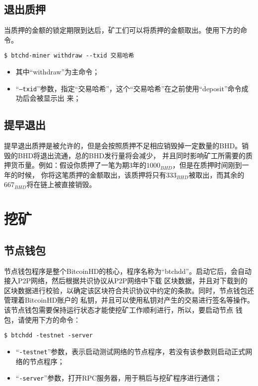 \subsection{退出质押}
\begin{flushleft}
    当质押的金额的锁定期限到达后，矿工们可以将质押的金额取出。使用下方的命令。
\end{flushleft}
\scriptsize
\begin{verbatim}
$ btchd-miner withdraw --txid 交易哈希
\end{verbatim}
\normalsize
\begin{itemize}
    \item 其中``withdraw''为主命令；
    \item ``\texttt{--txid}''参数，指定``交易哈希''，这个``交易哈希''在之前使用``deposit''命令成功后会被显示出
        来；
\end{itemize}
\subsection{提早退出}
\begin{flushleft}
    提早退出质押是被允许的，但是会按照质押不足相应销毁掉一定数量的BHD。销毁的BHD将退出流通，总的BHD发行量将会减少，
    并且同时影响矿工所需要的质押货币量。例如：假设你质押了一笔为期3年的$1000_{BHD}$，但是在质押时间刚到一年的时候，
    你将这笔质押的金额取出，该质押将只有$333_{BHD}$被取出，而其余的$667_{BHD}$将在链上被直接销毁。
\end{flushleft}
\section{挖矿}
\subsection{节点钱包}
\begin{flushleft}
    节点钱包程序是整个BitcoinHD的核心，程序名称为``btchdd''。启动它后，会自动接入P2P网络，然后根据共识协议从P2P网络中下载
    区块数据，并且对下载到的区块数据进行校验，以确定该区块符合共识协议中约定的条款。同时，节点钱包还管理着BitcoinHD账户的
    私钥，并且可以使用私钥对产生的交易进行签名等操作。该节点钱包需要保持运行状态才能使挖矿工作顺利进行，所以，要启动节点
    钱包，请使用下方的命令：
\end{flushleft}
\scriptsize
\begin{verbatim}
$ btchdd -testnet -server
\end{verbatim}
\normalsize
\begin{itemize}
    \item ``\texttt{-testnet}''参数，表示启动测试网络的节点程序，若没有该参数则启动正式网络的节点程序；
    \item ``\texttt{-server}''参数，打开RPC服务器，用于稍后与挖矿程序进行通信；
\end{itemize}
